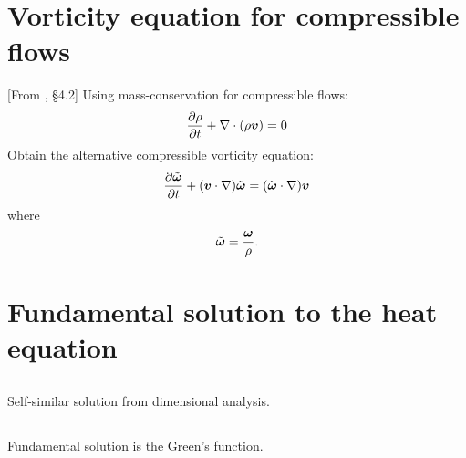\documentclass[11pt,letterpaper]{article}
\begin{document}
\section{Vorticity equation for compressible flows}
[From \cite{Vallis_17}, \S 4.2] Using mass-conservation for compressible flows:
\begin{align}
    \frac{\partial\rho}{\partial t}+\nabla\cdot(\rho\boldsymbol{v}) = 0
\end{align}
Obtain the alternative compressible vorticity equation:
\begin{align}
    \frac{\partial\tilde{\boldsymbol{\omega}}}{\partial t}+(\boldsymbol{v}\cdot \nabla)\tilde{\boldsymbol{\omega}} = (\tilde{\boldsymbol{\omega}}\cdot \nabla)\boldsymbol{v}
\end{align}
where
\begin{align}
    \tilde{\boldsymbol{\omega}} = \frac{\boldsymbol{\omega}}{\rho}.
\end{align}

\section{Fundamental solution to the heat equation}
\subsection{}
Self-similar solution from dimensional analysis. 

\subsection{}
Fundamental solution is the Green's function.




    
\vfill
\printbibliography
\end{document}
